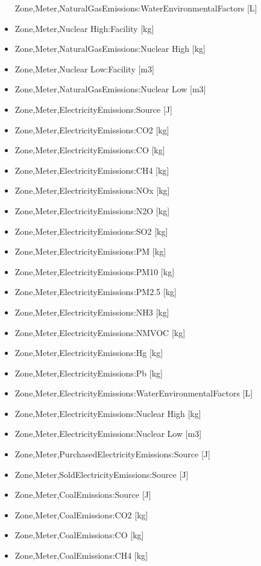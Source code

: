 \begin{itemize}
  Zone,Meter,NaturalGasEmissions:WaterEnvironmentalFactors {[}L{]}
\item
  Zone,Meter,Nuclear High:Facility {[}kg{]}
\item
  Zone,Meter,NaturalGasEmissions:Nuclear High {[}kg{]}
\item
  Zone,Meter,Nuclear Low:Facility {[}m3{]}
\item
  Zone,Meter,NaturalGasEmissions:Nuclear Low {[}m3{]}
\item
  Zone,Meter,ElectricityEmissions:Source {[}J{]}
\item
  Zone,Meter,ElectricityEmissions:CO2 {[}kg{]}
\item
  Zone,Meter,ElectricityEmissions:CO {[}kg{]}
\item
  Zone,Meter,ElectricityEmissions:CH4 {[}kg{]}
\item
  Zone,Meter,ElectricityEmissions:NOx {[}kg{]}
\item
  Zone,Meter,ElectricityEmissions:N2O {[}kg{]}
\item
  Zone,Meter,ElectricityEmissions:SO2 {[}kg{]}
\item
  Zone,Meter,ElectricityEmissions:PM {[}kg{]}
\item
  Zone,Meter,ElectricityEmissions:PM10 {[}kg{]}
\item
  Zone,Meter,ElectricityEmissions:PM2.5 {[}kg{]}
\item
  Zone,Meter,ElectricityEmissions:NH3 {[}kg{]}
\item
  Zone,Meter,ElectricityEmissions:NMVOC {[}kg{]}
\item
  Zone,Meter,ElectricityEmissions:Hg {[}kg{]}
\item
  Zone,Meter,ElectricityEmissions:Pb {[}kg{]}
\item
  Zone,Meter,ElectricityEmissions:WaterEnvironmentalFactors {[}L{]}
\item
  Zone,Meter,ElectricityEmissions:Nuclear High {[}kg{]}
\item
  Zone,Meter,ElectricityEmissions:Nuclear Low {[}m3{]}
\item
  Zone,Meter,PurchasedElectricityEmissions:Source {[}J{]}
\item
  Zone,Meter,SoldElectricityEmissions:Source {[}J{]}
\item
  Zone,Meter,CoalEmissions:Source {[}J{]}
\item
  Zone,Meter,CoalEmissions:CO2 {[}kg{]}
\item
  Zone,Meter,CoalEmissions:CO {[}kg{]}
\item
  Zone,Meter,CoalEmissions:CH4 {[}kg{]}

\end{itemize}
